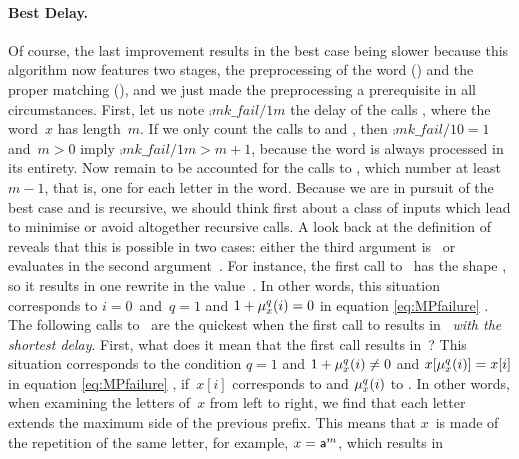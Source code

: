 \medskip

\paragraph{Best Delay.}

Of course, the last improvement results in the best case being slower
because this algorithm now features two stages, the preprocessing of
the word () and the proper matching
(), and we just made the preprocessing a prerequisite
in all circumstances. First, let us note \(\comp{mk\_fail/1}{m}\) the
delay of the calls , where the word~\(x\) has
length~\(m\). If we only count the calls to  and
, then \(\comp{mk\_fail/1}{0} = 1\) and~\({m>0}\)
imply \(\comp{mk\_fail/1}{m} > m + 1\), because the word is always
processed in its entirety. Now remain to be accounted for the calls to
, which number at least~\({m-1}\), that is, one for each
letter in the word. Because we are in pursuit of the best case and
 is recursive, we should think first about a class of
inputs which lead to minimise or avoid altogether recursive calls. A
look back at the definition of~ reveals that this is
possible in two cases: either the third argument 
is~ or  evaluates in the second
argument~. For instance, the first call to~
has the shape , so it results in one
rewrite in the value~. In other words, this situation
corresponds to \({i=0}\)~and~\(q=1\) and \(1 + \mu_{x}^{q}(i) =
0\) in equation \eqref{eq:MPfailure} . The
following calls to~ are the quickest when the first call
to  results in~ \emph{with the shortest
  delay}. First, what does it mean that the first call results
in~? This situation corresponds to the condition \(q=1\)
and \(1 + \mu_{x}^{q}(i) \neq 0\) and \(x[\mu_{x}^{q}(i)] =
x[i]\) in equation \eqref{eq:MPfailure} ,
if~\(x[i]\) corresponds to  and \(\mu_{x}^{q}(i)\) to
. In other words, when examining the letters of~\(x\)
from left to right, we find that each letter extends the maximum side
of the previous prefix. This means that \(x\)~is made of the
repetition of the same letter, for example, \(x=\textsf{a}^m\), which
results in
\begin{center}
\end{center}
